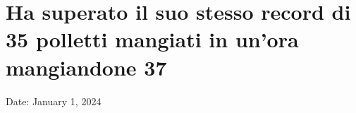 \section{Ha superato il suo stesso record di 35 polletti mangiati in
un'ora mangiandone
37}\label{ha-superato-il-suo-stesso-record-di-35-polletti-mangiati-in-unora-mangiandone-37}

Date: January 1, 2024
